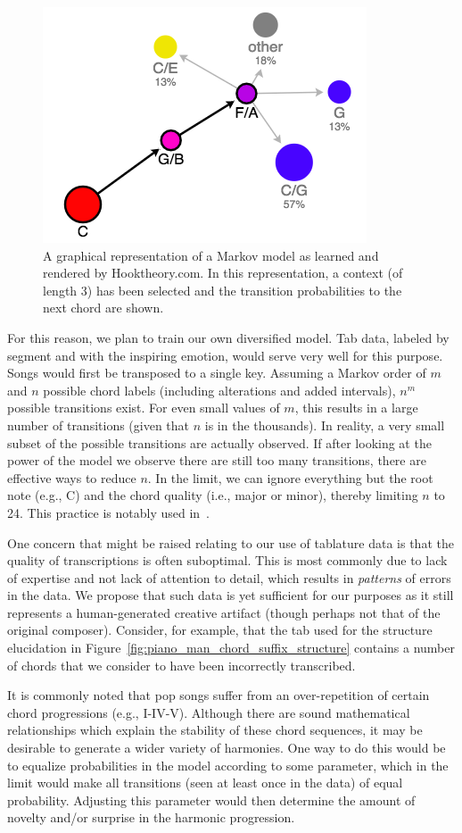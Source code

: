 \documentclass[11pt,phd]{byuprop}
\begin{document}
\begin{figure}
  \centering
  \includegraphics[width=.35\textwidth]{graphics/hook_theory_example.png}
  \caption{A graphical representation of a Markov model as learned and rendered by Hooktheory.com. In this representation, a context (of length 3) has been selected and the transition probabilities to the next chord are shown.}
    \label{fig:hook_theory}
\end{figure}

For this reason, we plan to train our own diversified model. Tab data, labeled by segment and with the inspiring emotion, would serve very well for this purpose. Songs would first be transposed to a single key. Assuming a Markov order of $m$ and $n$ possible chord labels (including alterations and added intervals), $n^m$ possible transitions exist. For even small values of $m$, this results in a large number of transitions (given that $n$ is in the thousands). In reality, a very small subset of the possible transitions are actually observed. If after looking at the power of the model we observe there are still too many transitions, there are effective ways to reduce $n$. In the limit, we can ignore everything but the root note (e.g., C) and the chord quality (i.e., major or minor), thereby limiting $n$ to 24. This practice is notably used in~\cite{steedman1984generative}.

One concern that might be raised relating to our use of tablature data is that the quality of transcriptions is often suboptimal. This is most commonly due to lack of expertise and not lack of attention to detail, which results in \emph{patterns} of errors in the data. We propose that such data is yet sufficient for our purposes as it still represents a human-generated creative artifact (though perhaps not that of the original composer). Consider, for example, that the tab used for the structure elucidation in Figure~\ref{fig:piano_man_chord_suffix_structure} contains a number of chords that we consider to have been incorrectly transcribed.

It is commonly noted that pop songs suffer from an over-repetition of certain chord progressions (e.g., I-IV-V). Although there are sound mathematical relationships which explain the stability of these chord sequences, it may be desirable to generate a wider variety of harmonies. One way to do this would be to equalize probabilities in the model according to some parameter, which in the limit would make all transitions (seen at least once in the data) of equal probability. Adjusting this parameter would then determine the amount of novelty and/or surprise in the harmonic progression.
\end{document}
